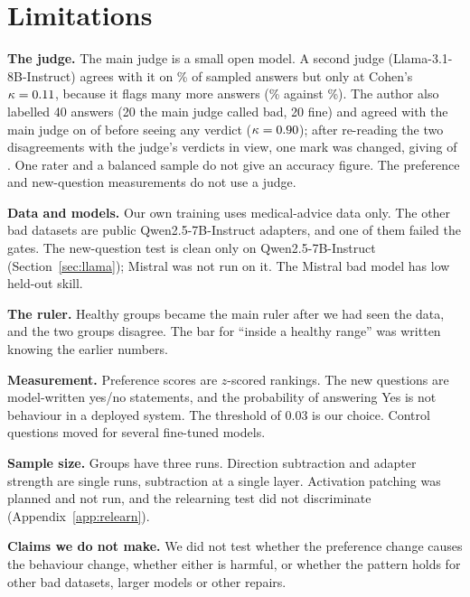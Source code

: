 \documentclass[10pt]{article}
\newcommand{\qwen}{Qwen2.5-7B-Instruct}
\begin{document}
\section{Limitations}\label{sec:limits}
\textbf{The judge.} The main judge is a small open model. A second judge (Llama-3.1-8B-Instruct) agrees with it on \judgeAgree\% of \judgeN{} sampled answers but only at Cohen's $\kappa=0.11$, because it flags many more answers (\judgeSecondPct\% against \judgeMainPct\%). The author also labelled 40 answers (20 the main judge called bad, 20 fine) and agreed with the main judge on \humanAgreeCount{} of \humanN{} before seeing any verdict ($\kappa=0.90$); after re-reading the two disagreements with the judge's verdicts in view, one mark was changed, giving \humanAfterCount{} of \humanN. One rater and a balanced sample do not give an accuracy figure. The preference and new-question measurements do not use a judge.

\textbf{Data and models.} Our own training uses medical-advice data only. The other bad datasets are public \qwen{} adapters, and one of them failed the gates. The new-question test is clean only on \qwen{} (Section~\ref{sec:llama}); Mistral was not run on it. The Mistral bad model has low held-out skill.

\textbf{The ruler.} Healthy groups became the main ruler after we had seen the data, and the two groups disagree. The bar for ``inside a healthy range'' was written knowing the earlier numbers.

\textbf{Measurement.} Preference scores are $z$-scored rankings. The new questions are model-written yes/no statements, and the probability of answering Yes is not behaviour in a deployed system. The threshold of 0.03 is our choice. Control questions moved for several fine-tuned models.

\textbf{Sample size.} Groups have three runs. Direction subtraction and adapter strength are single runs, subtraction at a single layer. Activation patching was planned and not run, and the relearning test did not discriminate (Appendix~\ref{app:relearn}).

\textbf{Claims we do not make.} We did not test whether the preference change causes the behaviour change, whether either is harmful, or whether the pattern holds for other bad datasets, larger models or other repairs.
\end{document}
